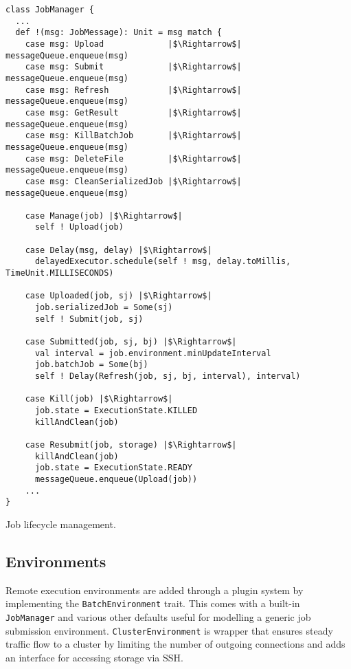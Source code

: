 \begin{listing}[h]
	\centering
	\begin{minipage}{13.8cm}
		\begin{verbatim}
class JobManager {
  ...
  def !(msg: JobMessage): Unit = msg match {
    case msg: Upload             |$\Rightarrow$| messageQueue.enqueue(msg)
    case msg: Submit             |$\Rightarrow$| messageQueue.enqueue(msg)
    case msg: Refresh            |$\Rightarrow$| messageQueue.enqueue(msg)
    case msg: GetResult          |$\Rightarrow$| messageQueue.enqueue(msg)
    case msg: KillBatchJob       |$\Rightarrow$| messageQueue.enqueue(msg)
    case msg: DeleteFile         |$\Rightarrow$| messageQueue.enqueue(msg)
    case msg: CleanSerializedJob |$\Rightarrow$| messageQueue.enqueue(msg)
    
    case Manage(job) |$\Rightarrow$|
      self ! Upload(job)
      
    case Delay(msg, delay) |$\Rightarrow$|
      delayedExecutor.schedule(self ! msg, delay.toMillis, TimeUnit.MILLISECONDS)
      
    case Uploaded(job, sj) |$\Rightarrow$|
      job.serializedJob = Some(sj)
      self ! Submit(job, sj)
      
    case Submitted(job, sj, bj) |$\Rightarrow$|
      val interval = job.environment.minUpdateInterval
      job.batchJob = Some(bj)
      self ! Delay(Refresh(job, sj, bj, interval), interval)
      
    case Kill(job) |$\Rightarrow$|
      job.state = ExecutionState.KILLED
      killAndClean(job)
      
    case Resubmit(job, storage) |$\Rightarrow$|
      killAndClean(job)
      job.state = ExecutionState.READY
      messageQueue.enqueue(Upload(job))      
    ...
}
		\end{verbatim}
	\end{minipage}
	\caption{Job lifecycle management.}
	\label{JobManager}
\end{listing}

\subsection{Environments}

Remote execution environments are added through a plugin system by implementing the \verb|BatchEnvironment| trait. This comes with a built-in \verb|JobManager| and various other defaults useful for modelling a generic job submission environment. \verb|ClusterEnvironment| is wrapper that ensures steady traffic flow to a cluster by limiting the number of outgoing connections and adds an interface for accessing storage via SSH.

